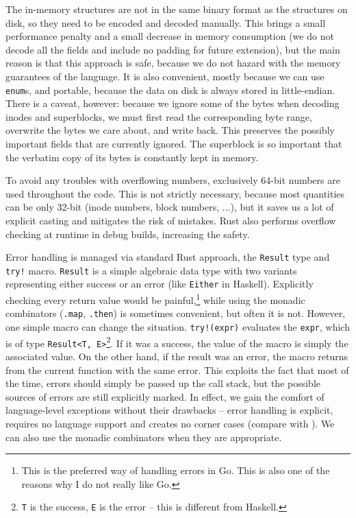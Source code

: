 The in-memory structures are not in the same binary format as the structures on
disk, so they need to be encoded and decoded manually. This brings a small
performance penalty and a small decrease in memory consumption (we do not decode
all the fields and include no padding for future extension), but the main reason
is that this approach is safe, because we do not hazard with the memory
guarantees of the language. It is also convenient, mostly because we can use
\texttt{enum}s, and portable, because the data on disk is always stored in
little-endian. There is a caveat, however: because we ignore some of the bytes
when decoding inodes and superblocks, we must first read the corresponding byte
range, overwrite the bytes we care about, and write back. This preserves the
possibly important fields that are currently ignored. The superblock is so
important that the verbatim copy of its bytes is constantly kept in memory.

To avoid any troubles with overflowing numbers, exclusively 64-bit numbers are
used throughout the code. This is not strictly necessary, because most
quantities can be only 32-bit (inode numbers, block numbers, ...), but it saves
us a lot of explicit casting and mitigates the risk of mistakes. Rust also
performs overflow checking at runtime in debug builds, increasing the safety.

Error handling is managed via standard Rust approach, the \texttt{Result} type
and \texttt{try!} macro. \texttt{Result} is a simple algebraic data type with
two variants representing either success or an error (like \texttt{Either} in
Haskell). Explicitly checking every return value would be painful,\footnote{This
is the preferred way of handling errors in Go. This is also one of the reasons
why I do not really like Go.} while using the monadic combinators
(\texttt{.map}, \texttt{.then}) is sometimes convenient, but often it is not.
However, one simple macro can change the situation. \texttt{try!(expr)}
evaluates the \texttt{expr}, which is of type \texttt{Result<T,
E>}\footnote{\texttt{T} is the success, \texttt{E} is the error -- this is
different from Haskell.}. If it was a success, the value of the macro is simply
the associated value. On the other hand, if the result was an error, the macro
returns from the current function with the same error. This exploits the fact
that most of the time, errors should simply be passed up the call stack, but the
possible sources of errors are still explicitly marked. In effect, we gain the
comfort of language-level exceptions without their drawbacks -- error handling
is explicit, requires no language support and creates no corner cases (compare
with \Cplusplus). We can also use the monadic combinators when they are
appropriate.

